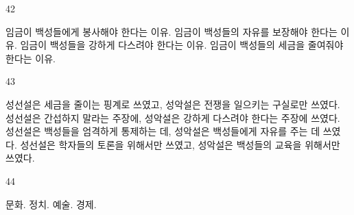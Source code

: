 \documentclass[fs9,seriesFre]{korfarm-base}
\begin{document}
\begin{kfSentenceUnit}{42}{}
\begin{kfChoices}
\kfChoice 임금이 백성들에게 봉사해야 한다는 이유.
\kfChoice 임금이 백성들의 자유를 보장해야 한다는 이유.
\kfChoice 임금이 백성들을 강하게 다스려야 한다는 이유.
\kfChoice 임금이 백성들의 세금을 줄여줘야 한다는 이유.
\end{kfChoices}
\end{kfSentenceUnit}

\begin{kfSentenceUnit}{43}{}
\begin{kfChoices}
\kfChoice 성선설은 세금을 줄이는 핑계로 쓰였고, 성악설은 전쟁을 일으키는 구실로만 쓰였다.
\kfChoice 성선설은 간섭하지 말라는 주장에, 성악설은 강하게 다스려야 한다는 주장에 쓰였다.
\kfChoice 성선설은 백성들을 엄격하게 통제하는 데, 성악설은 백성들에게 자유를 주는 데 쓰였다.
\kfChoice 성선설은 학자들의 토론을 위해서만 쓰였고, 성악설은 백성들의 교육을 위해서만 쓰였다.
\end{kfChoices}
\end{kfSentenceUnit}

\begin{kfSentenceUnit}{44}{}
\begin{kfChoices}
\kfChoice 문화.
\kfChoice 정치.
\kfChoice 예술.
\kfChoice 경제.
\end{kfChoices}
\end{kfSentenceUnit}

\kfEndMC

\end{document}
